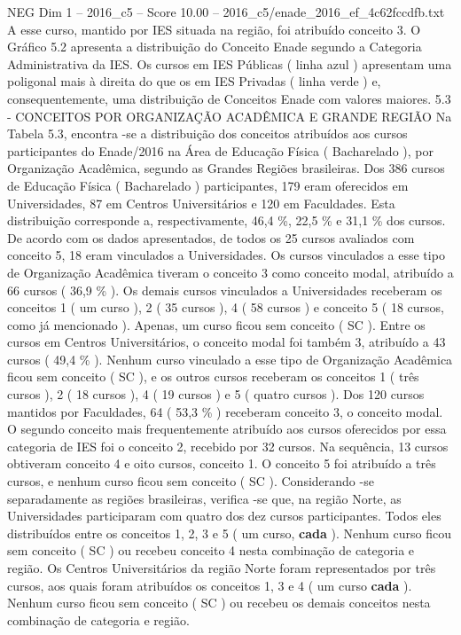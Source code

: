 \begin{textsample}{NEG Dim 1 – 2016\_c5 – Score 10.00 – 2016\_c5/enade\_2016\_ef\_4c62fccdfb.txt}
A esse curso, mantido por IES situada na região, foi atribuído conceito 3.
O Gráfico 5.2 apresenta a distribuição do Conceito Enade segundo a Categoria Administrativa da IES.
Os cursos em IES Públicas ( linha azul ) apresentam uma poligonal mais à direita do que os em IES Privadas ( linha verde ) e, consequentemente, uma distribuição de Conceitos Enade com valores maiores. 5.3 - CONCEITOS POR ORGANIZAÇÃO ACADÊMICA E GRANDE REGIÃO Na Tabela 5.3, encontra -se a distribuição dos conceitos atribuídos aos cursos participantes do Enade/2016 na Área de Educação Física ( Bacharelado ), por Organização Acadêmica, segundo as Grandes Regiões brasileiras.
Dos 386 cursos de Educação Física ( Bacharelado ) participantes, 179 eram oferecidos em Universidades, 87 em Centros Universitários e 120 em Faculdades.
Esta distribuição corresponde a, respectivamente, 46,4 \%, 22,5 \% e 31,1 \% dos cursos.
De acordo com os dados apresentados, de todos os 25 cursos avaliados com conceito 5, 18 eram vinculados a Universidades.
Os cursos vinculados a esse tipo de Organização Acadêmica tiveram o conceito 3 como conceito modal, atribuído a 66 cursos ( 36,9 \% ).
Os demais cursos vinculados a Universidades receberam os conceitos 1 ( um curso ), 2 ( 35 cursos ), 4 ( 58 cursos ) e conceito 5 ( 18 cursos, como já mencionado ).
Apenas, um curso ficou sem conceito ( SC ).
Entre os cursos em Centros Universitários, o conceito modal foi também 3, atribuído a 43 cursos ( 49,4 \% ).
Nenhum curso vinculado a esse tipo de Organização Acadêmica ficou sem conceito ( SC ), e os outros cursos receberam os conceitos 1 ( três cursos ), 2 ( 18 cursos ), 4 ( 19 cursos ) e 5 ( quatro cursos ).
Dos 120 cursos mantidos por Faculdades, 64 ( 53,3 \% ) receberam conceito 3, o conceito modal.
O segundo conceito mais frequentemente atribuído aos cursos oferecidos por essa categoria de IES foi o conceito 2, recebido por 32 cursos.
Na sequência, 13 cursos obtiveram conceito 4 e oito cursos, conceito 1.
O conceito 5 foi atribuído a três cursos, e nenhum curso ficou sem conceito ( SC ).
Considerando -se separadamente as regiões brasileiras, verifica -se que, na região Norte, as Universidades participaram com quatro dos dez cursos participantes.
Todos eles distribuídos entre os conceitos 1, 2, 3 e 5 ( um curso, \textbf{cada} ).
Nenhum curso ficou sem conceito ( SC ) ou recebeu conceito 4 nesta combinação de categoria e região.
Os Centros Universitários da região Norte foram representados por três cursos, aos quais foram atribuídos os conceitos 1, 3 e 4 ( um curso \textbf{cada} ).
Nenhum curso ficou sem conceito ( SC ) ou recebeu os demais conceitos nesta combinação de categoria e região.

\end{textsample}
